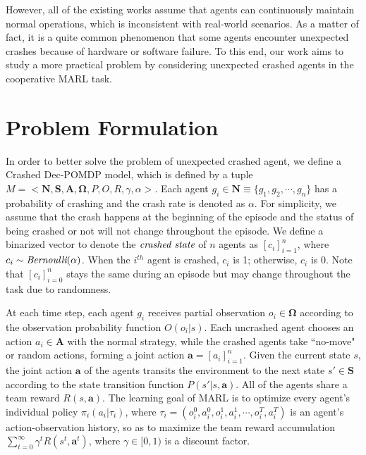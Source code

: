 \documentclass{article}
\begin{document}
However, all of the existing works assume that agents can continuously maintain normal operations, which is inconsistent with real-world scenarios.
As a matter of fact, it is a quite common phenomenon that some agents encounter unexpected crashes because of hardware or software failure.
To this end, our work aims to study a more practical problem by considering unexpected crashed agents in the cooperative MARL task.

\section{Problem Formulation}\label{sec:prob}
In order to better solve the problem of unexpected crashed agent, we define a Crashed Dec-POMDP model, which is defined by a tuple $M = < \bm{N}, \bm{S}, \bm{A}, \bm{\Omega}, P, O, R, \gamma, \alpha> $. 
Each agent  $g_i \in \bm{N} \equiv \{g_1, g_2,\cdots, g_n\}$ has a probability of crashing and the crash rate is denoted as $\alpha$.
For simplicity, we assume that the crash happens at the beginning of the episode and the status of being crashed or not will not change throughout the episode.
We define a binarized vector to denote the $\emph{crashed state}$ of $n$ agents as $[c_i]^n_{i=1}$, where $c_i\sim\emph{Bernoulli}(\alpha)$. 
When the $i^{th}$ agent is crashed, $c_i$ is 1; otherwise, $c_i$ is 0.
Note that $[c_i]^n_{i=0}$ stays the same during an episode but may change throughout the task due to randomness.

At each time step, each agent $g_i$ receives partial observation $o_i \in \bm{\Omega}$ according to the observation probability function $O(o_i|s)$.
Each uncrashed agent chooses an action $a_i \in \bm{A}$ with the normal strategy, while the crashed agents take ``no-move" or random actions, forming a joint action $\bm{a} =[a_i]_{i=1}^n$. 
Given the current state $s$, the joint action $\bm{a}$ of the agents transits the environment to the next state $s'\in \bm{S}$ according to the state transition function $P(s'|s, \bm{a})$. All of the agents share a team reward $R(s, \bm{a})$. 
The learning goal of MARL is to optimize every agent's individual policy $\pi_i(a_i|\tau_i)$, where $\tau_i = (o^0_i,a^0_i,o^1_i,a^1_i,\cdots,o^T_i,a^T_i)$ is an agent's action-observation history, so as to maximize the team reward accumulation $\sum_{t=0}^{\infty} \gamma^t R(s^t,\bm{a}^t)$, where $\gamma \in [0,1)$ is a discount factor.
\end{document}
